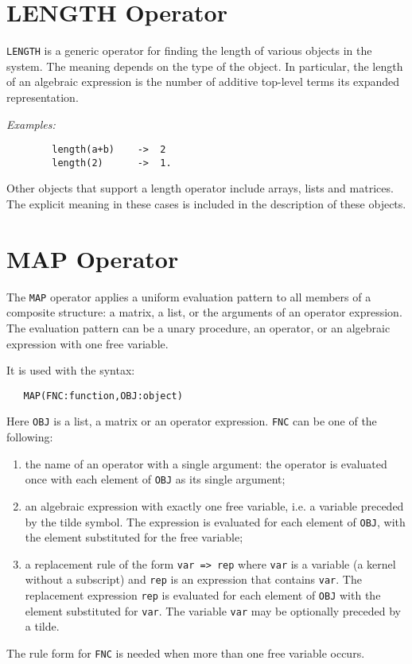 \section{LENGTH Operator}
\hypertarget{operator:LENGTH}{}
\texttt{LENGTH} is a generic operator for finding the
length of various objects in the system.  The meaning depends on the type
of the object.  In particular, the length of an algebraic expression is
the number of additive top-level terms its expanded representation.

\textit{Examples:}
\begin{verbatim}
        length(a+b)    ->  2
        length(2)      ->  1.
\end{verbatim}
Other objects that support a length operator include arrays, lists and
matrices. The explicit meaning in these cases is included in the description
of these objects.

\section{MAP Operator}
\hypertarget{operator:MAP}{}

The \texttt{MAP} operator applies a uniform evaluation pattern to all members
of a composite structure: a matrix, a list, or the arguments of an
operator expression.  The evaluation pattern can be a unary procedure, an
operator, or an algebraic expression with one free variable.

It is used with the syntax:
\begin{verbatim}
   MAP(FNC:function,OBJ:object)
\end{verbatim}
Here \texttt{OBJ} is a list, a matrix or an operator expression.
\texttt{FNC} can be one of the following:
\begin{enumerate}
\item the name of an operator with a single argument: the operator
is evaluated once with each element of \texttt{OBJ} as its single argument;
\item an algebraic expression with exactly one free variable, i.e.
a variable preceded by the tilde symbol. The expression
is evaluated for each element of \texttt{OBJ}, with the element
substituted for the free variable;
\item a replacement rule of the form \texttt{var => rep}
where \texttt{var} is a variable (a kernel without a subscript)
and \texttt{rep} is an expression that contains \texttt{var}.
The replacement expression \texttt{rep} is evaluated for each element of
\texttt{OBJ} with
the element substituted for  \texttt{var}. The variable \texttt{var} may be
optionally preceded by a tilde.
\end{enumerate}
The rule form  for \texttt{FNC} is needed when more than
one free variable occurs.

